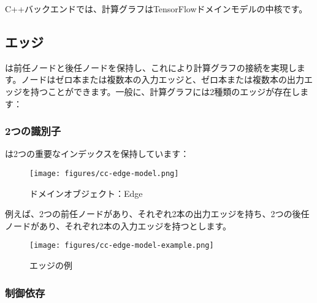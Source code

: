 \begin{content}

C++バックエンドでは、計算グラフはTensorFlowドメインモデルの中核です。

\subsection{エッジ}

は前任ノードと後任ノードを保持し、これにより計算グラフの接続を実現します。ノードはゼロ本または複数本の入力エッジと、ゼロ本または複数本の出力エッジを持つことができます。一般に、計算グラフには2種類のエッジが存在します：

\begin{enum}
\end{enum}

\subsubsection{2つの識別子}

は2つの重要なインデックスを保持しています：

\begin{enum}
\end{enum}

\begin{figure}[H]
\centering
\texttt{[image: figures/cc-edge-model.png]}
\caption{ドメインオブジェクト：Edge}
 \label{fig:cc-edge-model}
\end{figure}

例えば、2つの前任ノードがあり、それぞれ2本の出力エッジを持ち、2つの後任ノードがあり、それぞれ2本の入力エッジを持つとします。

\begin{figure}[H]
\centering
\texttt{[image: figures/cc-edge-model-example.png]}
\caption{エッジの例}
 \label{fig:cc-edge-model-example}
\end{figure}

\subsubsection{制御依存}


\end{content}

